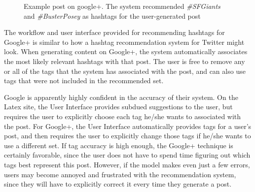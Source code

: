 \documentclass[man,floatsintext]{apa6}
\begin{document}
\begin{figure}[!htbp]
  \caption{Example post on google+. The system recommended \emph{\#SFGiants} and \emph{\#BusterPosey} as hashtags for the user-generated post}
  \label{figGoogle+Hashtags}
\end{figure}

The workflow and user interface provided for recommending hashtags for Google+ is similar to how a hashtag recommendation system for Twitter might look.
When generating content on Google+, the system automatically associates the most likely relevant hashtags with that post.
The user is free to remove any or all of the tags that the system has associated with the post, and can also use tags that were not included in the recommended set.

Google is apparently highly confident in the accuracy of their system.
On the Latex site, the User Interface provides subdued suggestions to the user, but requires the user to explicitly choose each tag he/she wants to associated with the post.
For Google+, the User Interface automatically provides tags for a user's post, and then requires the user to explicitly change those tags if he/she wants to use a different set.
If tag accuracy is high enough, the Google+ technique is certainly favorable, since the user does not have to spend time figuring out which tags best represent this post.
However, if the model makes even just a few errors, users may become annoyed and frustrated with the recommendation system, since they will have to explicitly correct it every time they generate a post.
\end{document}
